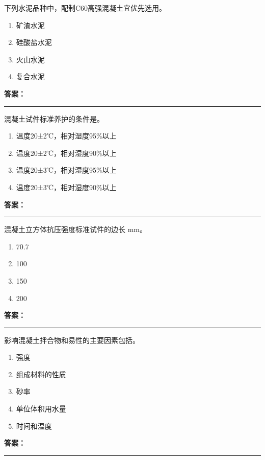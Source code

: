 \documentclass[UTF8,fontset=fandol,11pt]{ctexart}
\newcommand{\answerline}{\textcolor{answerred}{\rule{2.4cm}{0.7pt}}}
\begin{document}
\vspace{0.2em}

\begin{quizbox}[title={第 51 题}]
下列水泥品种中，配制C60高强混凝土宜优先选用。\\
\begin{enumerate}[label=\Alph*.]
\item 矿渣水泥
\item 硅酸盐水泥
\item 火山水泥
\item 复合水泥
\end{enumerate}
\textbf{\textcolor{answerred}{答案：}} \answerline
\end{quizbox}

\vspace{0.2em}

\begin{quizbox}[title={第 52 题}]
混凝土试件标准养护的条件是。\\
\begin{enumerate}[label=\Alph*.]
\item 温度20±2℃，相对湿度95\%以上
\item 温度20±2℃，相对湿度90\%以上
\item 温度20±3℃，相对湿度95\%以上
\item 温度20±3℃，相对湿度90\%以上
\end{enumerate}
\textbf{\textcolor{answerred}{答案：}} \answerline
\end{quizbox}

\vspace{0.2em}

\begin{quizbox}[title={第 53 题}]
混凝土立方体抗压强度标准试件的边长 mm。\\
\begin{enumerate}[label=\Alph*.]
\item 70.7
\item 100
\item 150
\item 200
\end{enumerate}
\textbf{\textcolor{answerred}{答案：}} \answerline
\end{quizbox}

\vspace{0.2em}

\begin{quizbox}[title={第 54 题}]
影响混凝土拌合物和易性的主要因素包括。\\
\begin{enumerate}[label=\Alph*.]
\item 强度
\item 组成材料的性质
\item 砂率
\item 单位体积用水量
\item 时间和温度
\end{enumerate}
\textbf{\textcolor{answerred}{答案：}} \answerline
\end{quizbox}
\end{document}
